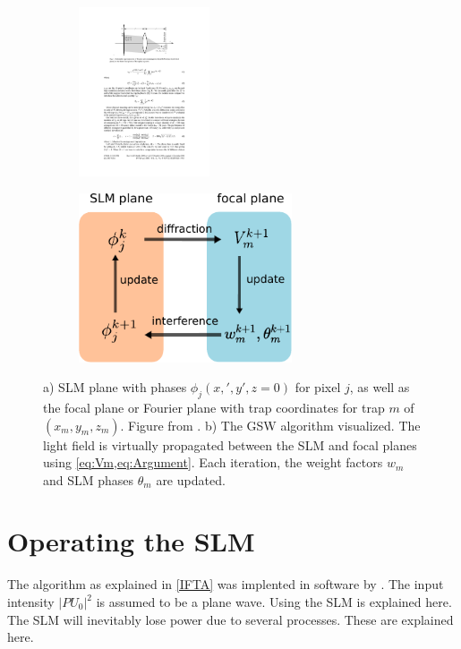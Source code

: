 \begin{figure}
\centering
	\begin{subfigure}{.56\textwidth}
		\centering
		\includegraphics[height=5cm]{figures/SLMgeometry.pdf}
		\caption{}
		\label{fig:SLMgeometry}
	\end{subfigure}
	\begin{subfigure}{.43\textwidth}
		\centering
		\includegraphics[height=5cm]{figures/WeightedGerschbergSaxton.pdf}
		\caption{}
		\label{fig:MOTconcept}
	\end{subfigure}
	\caption{a) SLM plane with phases $\phi_j(x,',y',z=0)$ for pixel $j$, as well as the focal plane or Fourier plane with trap coordinates for trap $m$ of $(x_m,y_m,z_m)$. Figure from \cite{DiLeonardo2007}. b) The \ac{GSW} algorithm visualized. The light field is virtually propagated between the SLM and focal planes using \cref{eq:Vm,eq:Argument}. Each iteration, the weight factors $w_m$ and SLM phases $\theta_m$ are updated. }
	\label{fig:GerschbergSaxton}
\end{figure}


\section{Operating the SLM}

The algorithm as explained in \cref{IFTA} was implented in software by \cite{Bijnen2015}. The input intensity $|PU_0|^2$ is assumed to be a plane wave. Using the SLM is explained here. The SLM will inevitably lose power due to several processes. These are explained here. 


